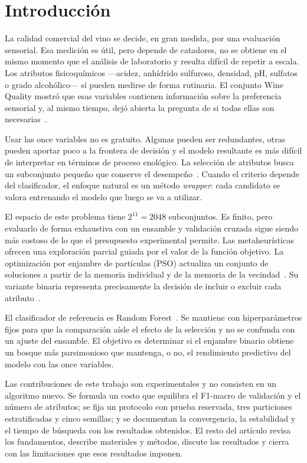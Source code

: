 \documentclass[conference]{IEEEtran}
\begin{document}
\section{Introducción}
La calidad comercial del vino se decide, en gran medida, por una evaluación sensorial. Esa medición es útil, pero depende de catadores, no se obtiene en el mismo momento que el análisis de laboratorio y resulta difícil de repetir a escala. Los atributos fisicoquímicos ---acidez, anhídrido sulfuroso, densidad, pH, sulfatos o grado alcohólico--- sí pueden medirse de forma rutinaria. El conjunto Wine Quality mostró que esas variables contienen información sobre la preferencia sensorial y, al mismo tiempo, dejó abierta la pregunta de si todas ellas son necesarias~\cite{cortez2009}.

Usar las once variables no es gratuito. Algunas pueden ser redundantes, otras pueden aportar poco a la frontera de decisión y el modelo resultante es más difícil de interpretar en términos de proceso enológico. La selección de atributos busca un subconjunto pequeño que conserve el desempeño~\cite{guyon2003,kohavi1997}. Cuando el criterio depende del clasificador, el enfoque natural es un método \emph{wrapper}: cada candidato se valora entrenando el modelo que luego se va a utilizar.

El espacio de este problema tiene $2^{11}=2048$ subconjuntos. Es finito, pero evaluarlo de forma exhaustiva con un ensamble y validación cruzada sigue siendo más costoso de lo que el presupuesto experimental permite. Las metaheurísticas ofrecen una exploración parcial guiada por el valor de la función objetivo. La optimización por enjambre de partículas (PSO) actualiza un conjunto de soluciones a partir de la memoria individual y de la memoria de la vecindad~\cite{kennedy1995}. Su variante binaria representa precisamente la decisión de incluir o excluir cada atributo~\cite{kennedy1997}.

El clasificador de referencia es Random Forest~\cite{breiman2001}. Se mantiene con hiperparámetros fijos para que la comparación aísle el efecto de la selección y no se confunda con un ajuste del ensamble. El objetivo es determinar si el enjambre binario obtiene un bosque más parsimonioso que mantenga, o no, el rendimiento predictivo del modelo con las once variables.

Las contribuciones de este trabajo son experimentales y no consisten en un algoritmo nuevo. Se formula un costo que equilibra el F1-macro de validación y el número de atributos; se fija un protocolo con prueba reservada, tres particiones estratificadas y cinco semillas; y se documentan la convergencia, la estabilidad y el tiempo de búsqueda con los resultados obtenidos. El resto del artículo revisa los fundamentos, describe materiales y métodos, discute los resultados y cierra con las limitaciones que esos resultados imponen.
\end{document}
